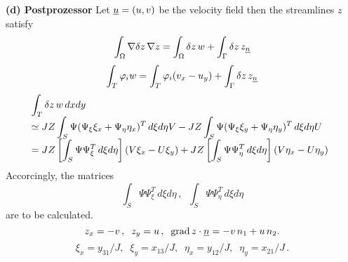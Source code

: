 \documentclass[12pt,a4paper,USenglish,twoside]{book}
\begin{document}
\par
{\bf (d) Postprozessor}
Let $\u = (u,v)$ be the velocity field then the streamlines $z$ satisfy
%
\[
\int _{\Omega}\nabla \delta z\, \nabla z
= \int_{\Omega}\delta z\, w  + \int_{\Gamma}\delta z \, z_{\n}
\]
\[
\int_T\phi_iw = \int_T\phi_i(v_x - u_y) + \int_{\Gamma}\delta z \, z_{\n}
\]
\[
\ba{.}{l}
\dis \int_T\delta z\, w \,dxdy\\[1ex]
\simeq \dis
JZ\int_S\Psi(\Psi_{\xi}\xi_x + \Psi_{\eta}\eta_x)^T\,d\xi d\eta V
- JZ \int_S\Psi(\Psi_{\xi}\xi_y + \Psi_{\eta}\eta_y)^T\,d\xi d\eta U\\[1ex]
= \dis
JZ \left[\int_S\Psi\Psi_{\xi}^T\,d\xi d\eta\right](V\xi_x - U\xi_y)
+
JZ\left[\int_S\Psi\Psi_{\eta}^T\,d\xi d\eta\right](V\eta_x - U\eta_y)
\ea{.}
\]
Accorcingly, the matrices
\[
\int_S\Psi\Psi_{\xi}^T\,d\xi d\eta\,,\;\;
\int_S\Psi\Psi_{\eta}^T\,d\xi d\eta
\]
are to be calculated.
%
\[
z_x = - v\,,\;\; z_y = u\,,\;\; \grad z\cdot \n = -v\,n_1 + u\,n_2.
\]
%
\[
\xi _x = y_{31}/J, \;\; \xi _y = x_{13}/J, \;\;
\eta _x = y_{12}/J, \;\; \eta _y = x_{21}/J\,.
\]
\end{document}
